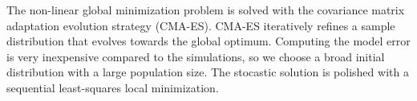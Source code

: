 The non-linear global minimization problem is solved with the covariance matrix adaptation evolution strategy (CMA-ES).
CMA-ES iteratively refines a sample distribution that evolves towards the global optimum.
Computing the model error is very inexpensive compared to the simulations, so we choose a broad initial distribution with a large population size.
The stocastic solution is polished with a sequential least-squares local minimization.

